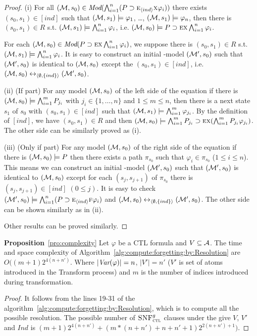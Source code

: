 \documentclass[letterpaper]{article}
\begin{document}
\begin{proof}
(i)  For all $({\cal M}, s_0) \in \textit{Mod}(\bigwedge_{i=1}^n (P\supset \textsc{e}_{{\langle{ind}\rangle}} \textsc{x} \varphi_i))$ there exists $(s_0, s_1)\in [ind]$ such that $({\cal M}, s_1) \models \varphi_1$, \dots, $({\cal M}, s_1) \models \varphi_n$, then there is $(s_0, s_1)\in R$ s.t. $({\cal M}, s_1) \models \bigwedge_{i=1}^n \varphi_i$, i.e. $({\cal M}, s_0) \models P\supset \textsc{e} \textsc{x} \bigwedge_{i=1}^n \varphi_i$.

For each $({\cal M}, s_0) \in \textit{Mod}(P\supset \textsc{e} \textsc{x} \bigwedge_{i=1}^n \varphi_i)$, we suppose there is $(s_0, s_1)\in R$ s.t. $({\cal M}, s_1) \models \bigwedge_{i=1}^n \varphi_i$. It is easy to construct an initial \Ind-model $({\cal M}', s_0)$ such that $({\cal M}', s_0)$ is identical to $({\cal M}, s_0)$ except the $(s_0, s_1) \in [ind]$, i.e. $({\cal M}, s_0) \leftrightarrow_{{\langle{\emptyset, \{ind\}}\rangle}} ({\cal M}', s_0)$.

(ii) (If part) For any model $({\cal M},s_0)$ of the left side of the equation if there is $({\cal M},s_0) \models \bigwedge_{i=1}^m P_{j_i}$ with $j_i \in \{1, \dots, n\}$ and $1\leq m \leq n$, then there is a next state $s_1$ of $s_0$ with $(s_0, s_1) \in [ind]$ such that $({\cal M}, s_1) \models \bigwedge_{i=1}^m \varphi_{j_i}$. By the definition of $[ind]$, we have $(s_0, s_1) \in R$ and then $({\cal M}, s_0) \models \bigwedge_{i=1}^m P_{j_i} \supset \textsc{e} \textsc{x} (\bigwedge_{i=1}^m P_{j_i} \varphi_{j_i})$. The other side can be similarly proved as (i).

(iii) (Only if part) For any model $({\cal M},s_0)$ of the right side of the equation if there is $({\cal M},s_0) \models P$ then there exists a path $\pi_{s_0}$ such that $\varphi_i \in \pi_{s_0}$ ($1\leq i \leq n$). This means we can construct an initial \Ind-model $({\cal M}', s_0)$ such that $({\cal M}', s_0)$ is identical to $({\cal M}, s_0)$ except for each $(s_j, s_{j+1})$ of $\pi_{s_0}$ there is $(s_j, s_{j+1}) \in [ind]$ $(0\leq j)$. It is easy to check $({\cal M}', s_0) \models \bigwedge_{i=1}^n (P\supset \textsc{e}_{{\langle{ind}\rangle}} \textsc{f} \varphi_i)$ and  $({\cal M}, s_0) \leftrightarrow_{{\langle{\emptyset, \{ind\}}\rangle}} ({\cal M}', s_0)$.  The other side can be shown similarly as in (ii).

Other results can be proved similarly.
\end{proof}


\noindent\textbf{Proposition}~\ref{pro:complexity}
Let $\varphi$ be a CTL formula and $V \subseteq {\cal A}$.
The time and space complexity of Algorithm~\ref{alg:compute:forgetting:by:Resolution} are $O((m+1)2^{4(n+n')}$. Where $|\textit{Var}(\varphi)|=n$, $|V'|=n'$ ($V'$ is set of atoms introduced in the Transform process) and $m$ is the number of indices introduced during transformation.
\begin{proof}
It follows from the lines 19-31 of the algorithm~\ref{alg:compute:forgetting:by:Resolution}, which is to compute all the possible resolution.
The possible number of ${\textsc{SNF}_{\textsc{ctl}}^g}$ clauses under the give $V$, $V'$ and $Ind$ is $(m+1)2^{4(n+n')}+(m*(n+n')+n+n'+1)2^{2(n+n')+1})$.
\end{proof}
 
\end{document}
